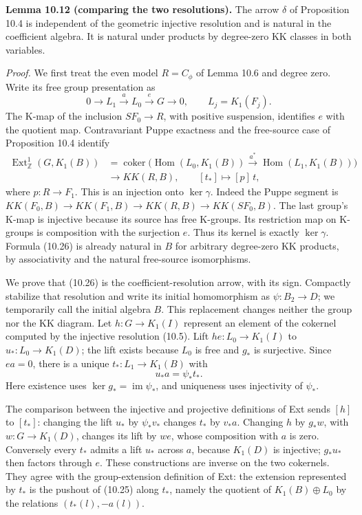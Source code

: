 \documentclass[
  11pt,
]{article}
\begin{document}
\textbf{Lemma 10.12 (comparing the two resolutions).} The arrow
\(\delta\) of Proposition 10.4 is independent of the geometric injective
resolution and is natural in the coefficient algebra. It is natural
under products by degree-zero KK classes in both variables.

\emph{Proof.} We first treat the even model \(R=C_\phi\) of Lemma 10.6
and degree zero. Write its free group presentation as \[
0\longrightarrow L_1\xrightarrow{a}L_0
\xrightarrow{e}G\longrightarrow0,\qquad
L_j=K_1(F_j).
\tag{10.25}
\] The K-map of the inclusion \(SF_0\to R\), with positive suspension,
identifies \(e\) with the quotient map. Contravariant Puppe exactness
and the free-source case of Proposition 10.4 identify \[
\begin{aligned}
\operatorname{Ext}^1_{\mathbb Z}(G,K_1(B))
&=\operatorname{coker}\bigl(
\operatorname{Hom}(L_0,K_1(B))
\xrightarrow{a^*}\operatorname{Hom}(L_1,K_1(B))\bigr)\\
&\longrightarrow KK(R,B),\qquad [t_*]\longmapsto [p]\,t,
\end{aligned}
\tag{10.26}
\] where \(p:R\to F_1\). This is an injection onto \(\ker\gamma\).
Indeed the Puppe segment is
\(KK(F_0,B)\to KK(F_1,B)\to KK(R,B)\to KK(SF_0,B)\). The last group's
K-map is injective because its source has free K-groups. Its restriction
map on K-groups is composition with the surjection \(e\). Thus its
kernel is exactly \(\ker\gamma\). Formula (10.26) is already natural in
\(B\) for arbitrary degree-zero KK products, by associativity and the
natural free-source isomorphisms.

We prove that (10.26) is the coefficient-resolution arrow, with its
sign. Compactly stabilize that resolution and write its initial
homomorphism as \(\psi:B_2\to D\); we temporarily call the initial
algebra \(B\). This replacement changes neither the group nor the KK
diagram. Let \(h:G\to K_1(I)\) represent an element of the cokernel
computed by the injective resolution (10.5). Lift \(he:L_0\to K_1(I)\)
to \(u_*:L_0\to K_1(D)\); the lift exists because \(L_0\) is free and
\(g_*\) is surjective. Since \(ea=0\), there is a unique
\(t_*:L_1\to K_1(B)\) with \[
u_*a=\psi_*t_*.
\tag{10.27}
\] Here existence uses \(\ker g_*=\operatorname{im}\psi_*\), and
uniqueness uses injectivity of \(\psi_*\).

The comparison between the injective and projective definitions of Ext
sends \([h]\) to \([t_*]\): changing the lift \(u_*\) by \(\psi_*v_*\)
changes \(t_*\) by \(v_*a\). Changing \(h\) by \(g_*w\), with
\(w:G\to K_1(D)\), changes its lift by \(we\), whose composition with
\(a\) is zero. Conversely every \(t_*\) admits a lift \(u_*\) across
\(a\), because \(K_1(D)\) is injective; \(g_*u_*\) then factors through
\(e\). These constructions are inverse on the two cokernels. They agree
with the group-extension definition of Ext: the extension represented by
\(t_*\) is the pushout of (10.25) along \(t_*\), namely the quotient of
\(K_1(B)\oplus L_0\) by the relations \((t_*(l),-a(l))\).
\end{document}
